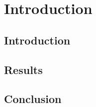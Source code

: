 %
%


\chapter{Introduction}
\vspace{-2em}
\minitoc

\startarabicpagenumbering %


\blindtext

\section{Introduction}

\blindtext

\section{Results}

\blindtext

\section{Conclusion}

\Blindtext